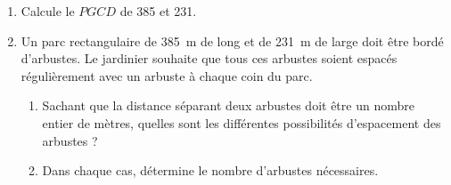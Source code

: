 
\begin{enumerate}
\item Calcule le $PGCD$ de 385 et 231.
\item Un parc rectangulaire de 385~m de long et de 231~m de large doit être bordé d'arbustes. Le jardinier souhaite que tous ces arbustes soient espacés régulièrement avec un arbuste à chaque coin du parc.
\begin{enumerate}
\item Sachant que la distance séparant deux arbustes doit être un nombre entier de mètres, quelles sont les différentes possibilités d'espacement des arbustes ?
\item Dans chaque cas, détermine le nombre d'arbustes nécessaires.
\end{enumerate}
\end{enumerate}
